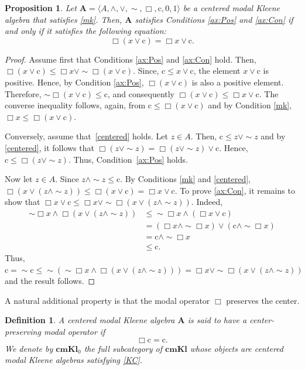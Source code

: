 \documentclass[10pt,a4paper]{amsart}
\newtheorem{proposition}[theorem]{Proposition}
\newtheorem{definition}[theorem]{Definition}
\newcommand{\cn}{\mathrm{c}}
\newcommand{\A}{\mathbf{A}}
\begin{document}
 \begin{proposition}
     Let $\mathbf{A}=\langle A,\wedge,\vee,\sim,\Box,\cn,0,1\rangle$ be a centered modal Kleene algebra that satisfies \eqref{mk}. Then, $\mathbf{A}$ satisfies Conditions \eqref{ax:Pos} and \eqref{ax:Con} if and only if it satisfies the following equation:
    \begin{equation}
        \Box(x\vee \cn)=\Box x\vee \cn.\tag{Cen}\label{centered}
    \end{equation} 
 \end{proposition}
 \begin{proof}
    Assume first that Conditions \eqref{ax:Pos} and \eqref{ax:Con} hold. Then, $\Box(x\vee \cn)\leq \Box x\vee \sim \Box(x\vee \cn)$. Since, $\cn \leq x\vee \cn$, the element $x\vee \cn$ is positive. Hence, by Condition \eqref{ax:Pos}, $\Box(x\vee \cn)$ is also a positive element. Therefore, $\sim \Box(x\vee \cn)\leq \cn$, and consequently $\Box(x\vee \cn)\leq \Box x\vee \cn$. The converse inequality follows, again, from $\cn\leq \Box(x\vee \cn)$ and by Condition \eqref{mk}, $\Box x\leq \Box(x\vee \cn)$.
 
     Conversely, assume that~\eqref{centered} holds. Let $z\in A$. Then, $\cn\leq z\vee\sim z$ and by \eqref{centered}, it follows that $\Box(z\vee\sim z)=\Box(z\vee\sim z)\vee \cn$. Hence, $\cn\leq \Box(z\vee\sim z)$. Thus, Condition~\eqref{ax:Pos} holds.

     Now let $z\in A$. Since $z\wedge\sim z\leq \cn$. By Conditions \eqref{mk} and \eqref{centered}, $\Box(x\vee (z\wedge \sim z))\leq \Box(x\vee \cn)=\Box x\vee \cn$. To prove \eqref{ax:Con}, it remains to show that $\Box x\vee \cn\leq \Box x\vee \sim \Box(x\vee(z\wedge\sim z))$. Indeed,
    \begin{align*}
       \sim\Box x \wedge  \Box(x\vee(z\wedge\sim z)) 
        &\le  \sim \Box x\wedge (\Box x\vee \cn)\\
        &=(\Box x\wedge\sim \Box x)\vee(\cn\wedge\sim \Box x)\\
        &=\cn\wedge\sim \Box x\\
        &\le \cn.
    \end{align*}
    Thus, $\cn=\sim \cn\leq \sim ( \sim\Box x\wedge \Box(x\vee(z\wedge\sim z)))=\Box x \vee \sim \Box(x\vee(z\wedge\sim z))$ and the result follows.
 \end{proof}

A natural additional property is that the modal operator $\Box$ preserves the center.

\begin{definition}
A centered modal Kleene algebra $\A$ is said to have a
\emph{center-preserving modal operator} if
\begin{equation}
\label{KC}\tag{KC}
\Box\cn=\cn.
\end{equation}
We denote by $\mathbf{cmKl}_0$ the full subcategory of $\mathbf{cmKl}$ whose objects are centered modal Kleene algebras satisfying \eqref{KC}.
\end{definition}
\end{document}

